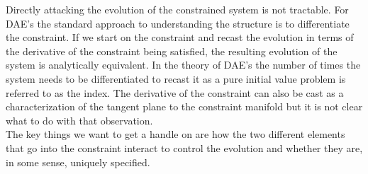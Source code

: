 \documentclass[final]{siamltex}
\begin{document}
Directly attacking the evolution of the constrained system is not tractable.
For DAE's the standard approach to understanding the structure is to differentiate the constraint.
If we start on the constraint and recast the evolution in terms of the derivative of the constraint
being satisfied, the resulting evolution of the system is analytically equivalent.  In the theory
of DAE's the number of times the system needs to be differentiated to recast it as a pure initial
value problem is referred to as the index.
The derivative of the constraint can also be cast as a characterization of the tangent plane to the
constraint manifold but it is not clear what to do with that observation.\\

The key things we want to get a handle on are how the two different elements that go into the
constraint interact to control the evolution and whether they are, in some sense, uniquely specified.\\
\end{document}
